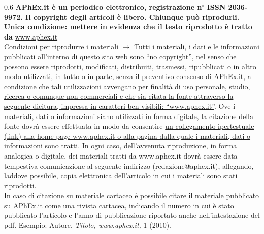 \mbox{}
\vskip88mm
\headrule
\vskip9mm
{\scriptsize
{\setlength{\baselineskip}
{0.6\baselineskip}
\sffamily
\textbf{APhEx.it \`e un periodico elettronico, registrazione n$^{\circ}$ ISSN
2036-9972. Il copyright degli articoli \`e libero. Chiunque pu\`o riprodurli.
Unica condizione: mettere in evidenza che il testo riprodotto \`e tratto da}
\underline{www.aphex.it} \\

Condizioni per riprodurre i materiali $\rightarrow$ Tutti i materiali, i dati e
le informazioni pubblicati all'interno di questo sito web sono ``no copyright'',
nel senso che possono essere riprodotti, modificati, distribuiti, trasmessi,
ripubblicati o in altro modo utilizzati, in tutto o in parte, senza il
preventivo consenso di APhEx.it, \ul{a condizione che tali utilizzazioni
avvengano per finalit\`a di uso personale, studio, ricerca o comunque non
commerciali e che sia citata la fonte attraverso la seguente dicitura, impressa
in caratteri ben visibili: ``www.aphex.it''}. Ove i materiali, dati o
informazioni siano utilizzati in forma digitale, la citazione della fonte
dovr\`a essere effettuata in modo da consentire \ul{un collegamento ipertestuale
(link) alla home page www.aphex.it o alla pagina dalla quale i materiali, dati o
informazioni sono tratti}. In ogni caso, dell'avvenuta riproduzione, in forma
analogica o digitale, dei materiali tratti da www.aphex.it dovr\`a essere data
tempestiva comunicazione al seguente indirizzo (redazione@aphex.it), allegando,
laddove possibile, copia elettronica dell'articolo in cui i materiali sono stati
riprodotti. \\

In caso di citazione su materiale cartaceo \`e possibile citare il materiale
pubblicato su APhEx.it come una rivista cartacea, indicando il numero in cui \`e
stato pubblicato l'articolo e l'anno di pubblicazione riportato anche
nell’intestazione del pdf. Esempio: Autore, \emph{Titolo,
{\lcap}www.aphex.it{\rcap},} 1 (2010).
\par}
}
\vskip7mm
\headrule
